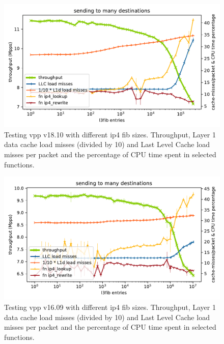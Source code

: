 \begin{figure}[!ht]
\noindent\hspace{0.5mm}\includegraphics[width=\linewidth]{pics/throughput_l3_routes_klaipeda32ghz_v3.pdf}
\caption{Testing \Ac{vpp} v18.10 with different \Ac{ip4} \Ac{fib} sizes. Throughput, Layer 1 data cache load misses (divided by 10) and Last Level Cache load misses per packet and the percentage of CPU time spent in selected functions.}
\label{graph:ip4fib}
\end{figure}

\begin{figure}[!ht]
\noindent\hspace{0.5mm}\includegraphics[width=\linewidth]{pics/throughput_l3_routes_klaipeda_v1609_32ghz_v3.pdf}
\caption{Testing \Ac{vpp} v16.09 with different \Ac{ip4} \Ac{fib} sizes. Throughput, Layer 1 data cache load misses (divided by 10) and Last Level Cache load misses per packet and the percentage of CPU time spent in selected functions. }
\label{graph:ip4fiblegacy}
\end{figure}


